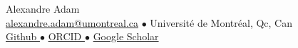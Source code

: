 \begin{center}
  {\LARGE Alexandre Adam} \\[4pt]
  {\small \href{mailto:alexandre.adam@mila.quebec}{alexandre.adam@umontreal.ca} $\bullet$ Université de Montréal, Qc, Can} \\
  {\small
\href{https://github.com/AlexandreAdam}{Github \faGithub} $\bullet$
\href{https://orcid.org/0000-0001-8806-7936}{ORCID \faOrcid} $\bullet$
\href{https://scholar.google.com/citations?user=Mmlh_CEAAAAJ&hl=en}{Google Scholar \faGraduationCap}
}
\end{center}
\vspace{1em}
